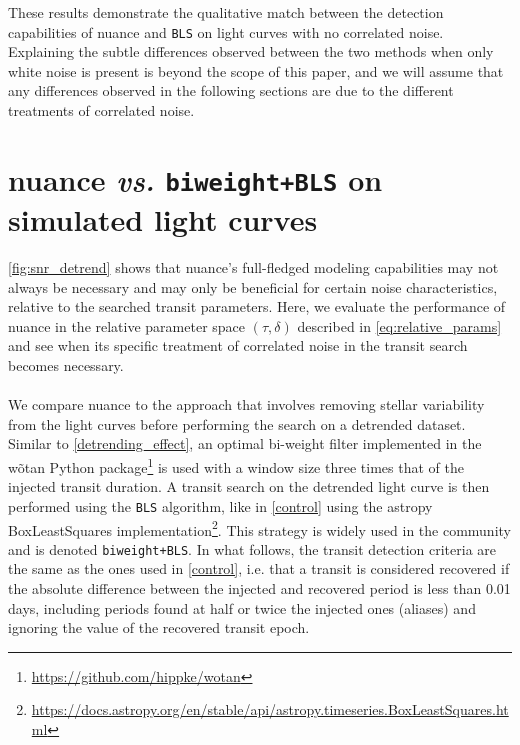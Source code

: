 \documentclass{aastex631}
\newcommand{\footlink}[1]{\footnote{\url{#1}}}
\begin{document}
These results demonstrate the qualitative match between the detection capabilities of \textsf{nuance} and \texttt{BLS} on light curves with no correlated noise. Explaining the subtle differences observed between the two methods when only white noise is present is beyond the scope of this paper, and we will assume that any differences observed in the following sections are due to the different treatments of correlated noise.

\section{\textsf{nuance} \textit{vs.} \texttt{biweight+BLS} on simulated light curves}\label{simu}
\autoref{fig:snr_detrend} shows that \textsf{nuance}'s full-fledged modeling capabilities may not always be necessary and may only be beneficial for certain noise characteristics, relative to the searched transit parameters. Here, we evaluate the performance of \textsf{nuance} in the relative parameter space $(\tau, \delta)$ described in \autoref{eq:relative_params} and see when its specific treatment of correlated noise in the transit search becomes necessary.\\\\
We compare \textsf{nuance} to the approach that involves removing stellar variability from the light curves before performing the search on a detrended dataset. Similar to \autoref{detrending_effect}, an optimal bi-weight filter implemented in the \textsf{wõtan} Python package\footlink{https://github.com/hippke/wotan} is used with a window size three times that of the injected transit duration. A transit search on the detrended light curve is then performed using the \texttt{BLS} algorithm, like in \autoref{control} using the \textsf{astropy} \textsf{BoxLeastSquares} implementation\footlink{https://docs.astropy.org/en/stable/api/astropy.timeseries.BoxLeastSquares.html}. This strategy is widely used in the community and is denoted \texttt{biweight+BLS}. In what follows, the transit detection criteria are the same as the ones used in \autoref{control}, i.e. that a transit is considered recovered if the absolute difference between the injected and recovered period is less than 0.01 days, including periods found at half or twice the injected ones (aliases) and ignoring the value of the recovered transit epoch.

\end{document}
